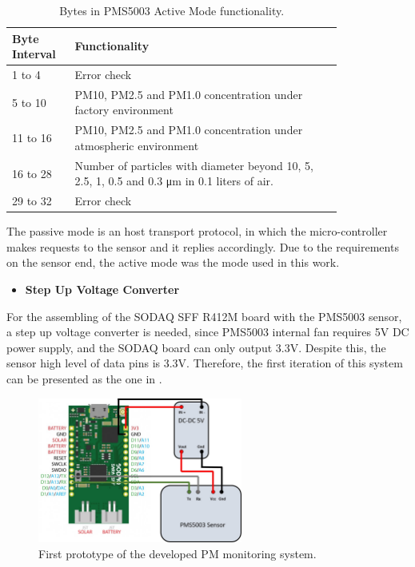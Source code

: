 \renewcommand\arraystretch{1.5}
\begin{table}[ht]
\centering
\caption{Bytes in PMS5003 Active Mode functionality.}
\label{table:active-mode}
\begin{tabular}[t]{l>{\raggedright\arraybackslash}p{0.815\linewidth}}
\toprule
Byte Interval&Functionality\\
\midrule
1 to 4&Error check\\
5 to 10&PM10, PM2.5 and PM1.0 concentration under factory environment\\
11 to 16& PM10, PM2.5 and PM1.0 concentration under atmospheric environment\\
16 to 28&Number of
particles with diameter beyond 10, 5, 2.5, 1, 0.5 and 0.3 μm in 0.1 liters of air.\\
29 to 32&Error check\\
\bottomrule
\end{tabular}
\end{table}%


The passive mode is an host transport protocol, in which the micro-controller makes requests to the sensor and it replies accordingly. Due to the requirements on the sensor end, the active mode was the mode used in this work.


\begin{itemize}[leftmargin=0.0mm]
  \item[] \textbf{Step Up Voltage Converter}
\end{itemize}

\noindent
For the assembling of the SODAQ SFF R412M board with the PMS5003 sensor, a step up voltage converter is needed, since PMS5003 internal fan requires 5V DC power supply, and the SODAQ board can only output 3.3V. Despite this, the sensor high level of data pins is 3.3V. Therefore, the first iteration of this system can be presented as the one in .


\begin{figure}[ht]
\centering
\includegraphics[width=0.6\textwidth]{./Images/ieec5.jpg}
\caption{First prototype of the developed PM monitoring system.}
\label{fig:ieec5}
\end{figure}

